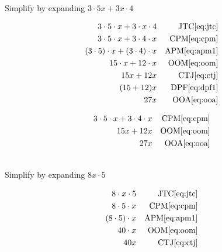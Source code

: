 \documentclass[20150903-160354-rs2.2-MarksMathNotebook.tex]{subfiles}
\begin{document}
\begin{example}[id:20141108-194156] \label{20141108-194156}  \hfill \\

Simplify by expanding $3 \cdot 5x + 3x \cdot 4$

\soln

\solnsteps
\begin{align*}
3 \cdot 5 \cdot x + 3 \cdot x \cdot 4 && \text{JTC} \eqref{eq:jtc} \\
3 \cdot 5 \cdot x + 3 \cdot 4 \cdot x && \text{CPM} \eqref{eq:cpm} \\
(3 \cdot 5) \cdot x + (3 \cdot 4) \cdot x && \text{APM} \eqref{eq:apm1} \\
15 \cdot x + 12 \cdot x && \text{OOM} \eqref{eq:oom} \\
15x +12x && \text{CTJ} \eqref{eq:ctj} \\
(15+12)x && \text{DPF} \eqref{eq:dpf1} \\
27x && \text{OOA} \eqref{eq:ooa}
\end{align*}

\soln

\lesssteps
\begin{align*}
3 \cdot 5 \cdot x + 3 \cdot 4 \cdot x && \text{CPM} \eqref{eq:cpm} \\
15x + 12x && \text{OOM} \eqref{eq:oom} \\
27x && \text{OOA} \eqref{eq:ooa}
\end{align*}

\end{example}

\begin{example}[id:20141108-173613] \label{20141108-173613}  \hfill \\

Simplify by expanding $8x \cdot 5$

\soln

\solnsteps
\begin{align*}
8 \cdot x \cdot 5 && \text{JTC} \eqref{eq:jtc} \\
8 \cdot 5 \cdot x && \text{CPM} \eqref{eq:cpm} \\
(8 \cdot 5) \cdot x && \text{APM} \eqref{eq:apm1} \\
40 \cdot x && \text{OOM} \eqref{eq:oom} \\
40x && \text{CTJ} \eqref{eq:ctj}
\end{align*}
\end{example}
\end{document}
